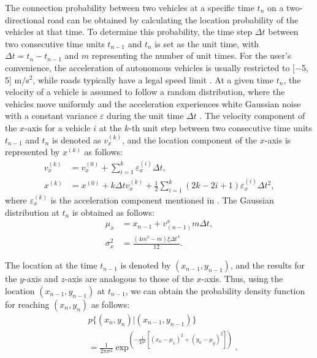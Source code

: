\documentclass[sensors,article,accept,moreauthors,pdftex]{Definitions/mdpi}
\begin{document}
The connection probability between two vehicles at a specific time $t_{n}$ on a two-directional road can be obtained by calculating the location probability of the vehicles at that time. To determine this probability, the time step $\Delta t$ between two consecutive time units $t_{n-1}$ and $t_{n}$ is set as the unit time, with $\Delta t=t_{n}-t_{n-1}$ and $m$ representing the number of unit times.
For the user's convenience, the acceleration of autonomous vehicles is usually restricted to [$-$5, 5] m/s$^{2}$, while roads typically have a legal speed limit \cite{Krajewski2018, Yen2020}.
At a given time $t_{n}$, the velocity of a vehicle is assumed to follow a random distribution, where the vehicles move uniformly and the acceleration experiences white Gaussian noise with a constant variance $\varepsilon$ during the unit time $\Delta t$ \cite{Jiang2019}.
The velocity component of the $x$-axis for a vehicle $i$ at the $k$-th unit step between two consecutive time units $t_{n-1}$ and $t_{n}$ is denoted as $v^{(k)}_{x}$, and the location component of the $x$-axis is represented by $x^{(k)}$ as follows:
\begin{align}
    v_{x}^{(k)}&=v_{x}^{(0)}+ \sum\limits_{i=1}^{k}\varepsilon_{x}^{(i)}\Delta t,\\
    x^{(k)}&=x^{(0)}+k \Delta tv_{x}^{(k)}+\frac{1}{2}\sum\limits_{i=1}^{k}(2k-2i+1)\varepsilon_{x}^{(i)}\Delta t^{2},
\end{align}
where $\varepsilon^{(k)}_{x}$ is the acceleration component mentioned in \cite{Lin2012}. The Gaussian distribution at $t_{n}$ is obtained as follows:\vspace{-3pt}
\begin{align}
    \mu_{x}&=x_{n-1}+v_{(n-1)}^{x}m\Delta t,\\
    \sigma_{x}^{2}&=\frac{(4m^{3}-m)\xi\Delta t^{4}}{12}.
\end{align}

The location at the time $t_{n-1}$ is denoted by $(x_{n-1}, y_{n-1})$, and the results for the $y$-axis and $z$-axis are analogous to those of the $x$-axis. Thus, using the location $(x_{n-1}, y_{n-1})$ at $t_{n-1}$, we can obtain the probability density function for reaching $(x_{n}, y_{n})$ as follows:
\begin{align}
    & p\{(x_{n}, y_{n})\vert (x_{n-1},y_{n-1})\}\\
    & =\frac{1}{2\pi\sigma^{2}}\exp^{\left(-\frac{1}{2\sigma^{2}}\left[(x_{n}-\mu_{x})^{2}+(y_{n}-\mu_{y})^{2}\right]\right)}.\nonumber
\end{align}
\end{document}
